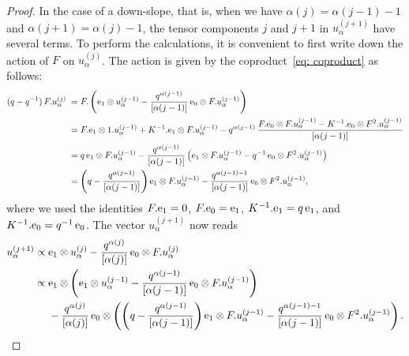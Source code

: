 \documentclass[oneside,english]{amsart}
\numberwithin{equation}{section}
\numberwithin{figure}{section}
\theoremstyle{plain}
\theoremstyle{plain}
\theoremstyle{plain}
\theoremstyle{remark}
\theoremstyle{plain}
\theoremstyle{plain}
\theoremstyle{plain}
\theoremstyle{plain}
\theoremstyle{plain}
\theoremstyle{plain}
\theoremstyle{plain}
\theoremstyle{plain}
\begin{document}
\begin{proof}
In the case of a down-slope, that is, when we have $\alpha(j) = \alpha(j-1)-1$ and 
$\alpha(j+1) = \alpha(j)-1$, the tensor components $j$ and $j+1$ in 
$u_{\alpha}^{(j+1)}$ have several terms. To perform the calculations,
it is convenient to first write down the action of $F$ on 
$u_{\alpha}^{(j)}$.
The action is given by the coproduct~\eqref{eq: coproduct} as follows:
\begin{align*}
(q-q^{-1}) \, F.u_\alpha^{(j)} \; & = 
F. \left( \mathrm{e}_1 \otimes u_\alpha^{(j-1)} 
- \frac{q^{\alpha(j-1)}}{\left[\alpha(j-1)\right]}\,\mathrm{e}_0 \otimes F.u_\alpha^{(j-1)} \right) \\
\; & = F.\mathrm{e}_1 \otimes 1.u_\alpha^{(j-1)} 
+ K^{-1}.\mathrm{e}_1 \otimes F.u_\alpha^{(j-1)}
- q^{\alpha(j-1)}\, \frac{F.\mathrm{e}_0 \otimes F.u_\alpha^{(j-1)}
- K^{-1}.\mathrm{e}_0 \otimes F^2.u_\alpha^{(j-1)}}{\left[\alpha(j-1)\right]} \\
\; & = q\, \mathrm{e}_1 \otimes F.u_\alpha^{(j-1)} 
- \frac{q^{\alpha(j-1)}}{\left[\alpha(j-1)\right]}\left( \mathrm{e}_1 \otimes F.u_\alpha^{(j-1)}
- q^{-1} \, \mathrm{e}_0 \otimes F^2.u_\alpha^{(j-1)} \right) \\
\; & = \left( q - \frac{q^{\alpha(j-1)}}{\left[\alpha(j-1)\right]} \right) 
\mathrm{e}_1 \otimes F.u_\alpha^{(j-1)}
- \frac{q^{\alpha(j-1)-1}}{\left[\alpha(j-1)\right]}\, \mathrm{e}_0 \otimes F^2.u_\alpha^{(j-1)},
\end{align*}
where we used the identities $F.\mathrm{e}_1 = 0$,
$F.\mathrm{e}_0 = \mathrm{e}_1$, $K^{-1}.\mathrm{e}_1 = q\,\mathrm{e}_1$, 
and $K^{-1}.\mathrm{e}_0 = q^{-1}\,\mathrm{e}_0$.
The vector $u_\alpha^{(j+1)}$ now reads
\begin{align*}
u_\alpha^{(j+1)} \propto \; &
\mathrm{e}_1 \otimes u_\alpha^{(j)} 
- \frac{q^{\alpha(j)}}{\left[\alpha(j)\right]}\,\mathrm{e}_0 \otimes F.u_\alpha^{(j)} \\
\propto \; &  \mathrm{e}_1 \otimes \left(
\mathrm{e}_1 \otimes u_\alpha^{(j-1)} 
- \frac{q^{\alpha(j-1)}}{\left[\alpha(j-1)\right]}\,\mathrm{e}_0 \otimes F.u_\alpha^{(j-1)} \right)  \\
\; & - \frac{q^{\alpha(j)}}{\left[\alpha(j)\right]}\,\mathrm{e}_0 \otimes \left(
\left( q - \frac{q^{\alpha(j-1)}}{\left[\alpha(j-1)\right]} \right) 
\mathrm{e}_1 \otimes F.u_\alpha^{(j-1)}
- \frac{q^{\alpha(j-1)-1}}{\left[\alpha(j-1)\right]}\, \mathrm{e}_0 \otimes F^2.u_\alpha^{(j-1)} \right).
\end{align*}


\end{proof}
\end{document}
